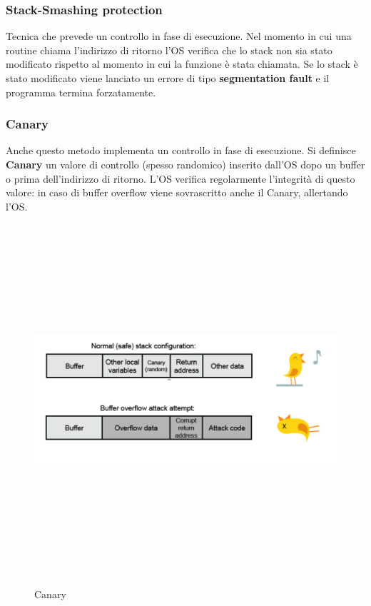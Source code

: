 \subsubsection{Stack-Smashing protection}
Tecnica che prevede un controllo in fase di esecuzione. Nel momento in cui una routine chiama l'indirizzo di ritorno l'OS verifica che lo stack non sia stato
modificato rispetto al momento in cui la funzione è stata chiamata. Se lo stack è stato modificato viene lanciato un errore di tipo \textbf{segmentation fault} e il programma termina forzatamente.
\subsubsection{Canary}
Anche questo metodo implementa un controllo in fase di esecuzione. Si definisce \textbf{Canary} un valore di controllo (spesso randomico) inserito dall'OS dopo un buffer o prima dell'indirizzo di ritorno. L'OS verifica regolarmente l'integrità di questo valore: in caso di buffer overflow viene sovrascritto anche il Canary, allertando l'OS.
\begin{figure}[htbp]
	\centering%
	\subfigure%
	{\includegraphics[height=13cm, width=13cm, keepaspectratio]{Immagini/sistemi_operativi/canary.png}}
	\caption{Canary\label{fig:canary}} 	
\end{figure}
